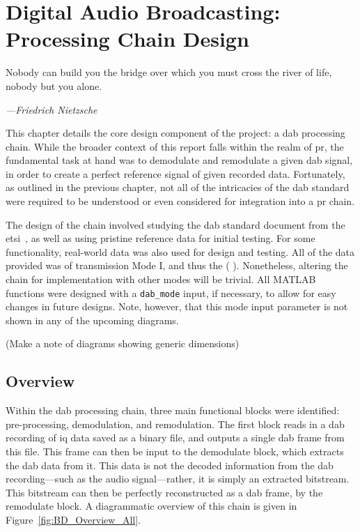 \documentclass[class=report,11pt,crop=false]{standalone}
\begin{document}
\ifstandalone
\tableofcontents
\fi
\chapter{Digital Audio Broadcasting: Processing Chain Design}
\epigraph{Nobody can build you the bridge over which you must cross the river of life, nobody but you alone.}%
    {\emph{---Friedrich Nietzsche}}

This chapter details the core design component of the project: a \gls{dab} processing chain. While the broader context of this report falls within the realm of \gls{pr}, the fundamental task at hand was to demodulate and remodulate a given \gls{dab} signal, in order to create a perfect reference signal of given recorded data. Fortunately, as outlined in the previous chapter, not all of the intricacies of the \gls{dab} standard were required to be understood or even considered for integration into a \gls{pr} chain.

The design of the chain involved studying the \gls{dab} standard document from the \gls{etsi}~\cite{dabstandard}, as well as using pristine reference data for initial testing. For some functionality, real-world data was also used for design and testing. All of the data provided was of transmission Mode I, and thus the ( ). Nonetheless, altering the chain for implementation with other modes will be trivial. All MATLAB functions were designed with a \texttt{dab\_mode} input, if necessary, to allow for easy changes in future designs. Note, however, that this mode input parameter is not shown in any of the upcoming diagrams.

(Make a note of diagrams showing generic dimensions)

\section{Overview}
Within the \gls{dab} processing chain, three main functional blocks were identified: pre-processing, demodulation, and remodulation. The first block reads in a \gls{dab} recording of \gls{iq} data saved as a binary file, and outputs a single \gls{dab} frame from this file. This frame can then be input to the demodulate block, which extracts the \gls{dab} data from it. This data is not the decoded information from the \gls{dab} recording---such as the audio signal---rather, it is simply an extracted bitstream. This bitstream can then be perfectly reconstructed as a \gls{dab} frame, by the remodulate block. A diagrammatic overview of this chain is given in Figure~\ref{fig:BD_Overview_All}.
\end{document}
